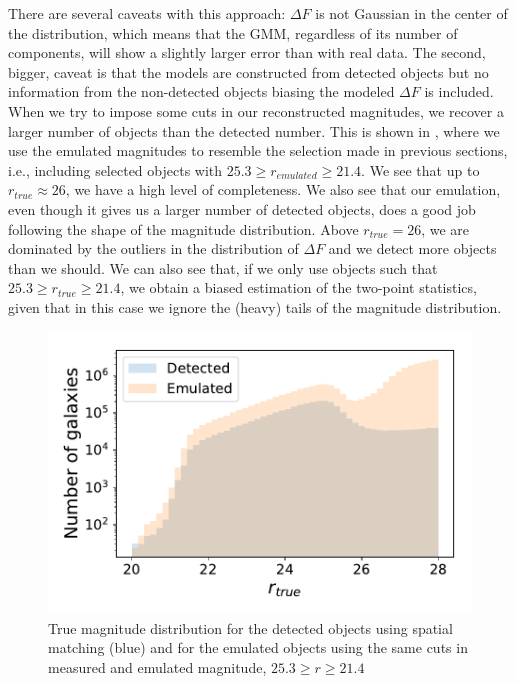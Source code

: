 \documentclass[twocolumn]{aastex62}
\begin{document}
There are several caveats with this approach: $\Delta F$ is not Gaussian in the center of the distribution, which means that the GMM, regardless of its number of components, will show a slightly larger error than with real data. The second, bigger, caveat is that the models are constructed from detected objects but no information from the non-detected objects biasing the modeled $\Delta F$ is included. When we try to impose some cuts in our reconstructed magnitudes, we recover a larger number of objects than the detected number. This is shown in , where we use the emulated magnitudes to resemble the selection made in previous sections, i.e., including selected objects with $25.3 \geq r_{emulated} \geq 21.4$. We see that up to $r _{true} \approx 26$, we have a high level of completeness. We also see that our emulation, even though it gives us a larger number of detected objects, does a good job following the shape of the magnitude distribution. Above $r_{true}=26$, we are dominated by the outliers in the distribution of $\Delta F$ and we detect more objects than we should. We can also see that, if we only use objects such that $25.3 \geq r_{true} \geq 21.4$, we obtain a biased estimation of the two-point statistics, given that in this case we ignore the (heavy) tails of the magnitude distribution.
\begin{figure}
\centering
\includegraphics[width=0.9\columnwidth]{emulated_magnitude_histogram}
\caption{True magnitude distribution for the detected objects using spatial matching (blue) and for the emulated objects using the same cuts in measured and emulated magnitude, $25.3 \geq r \geq 21.4$}
\label{fig:emulated_magnitudes}
\end{figure}
\end{document}
